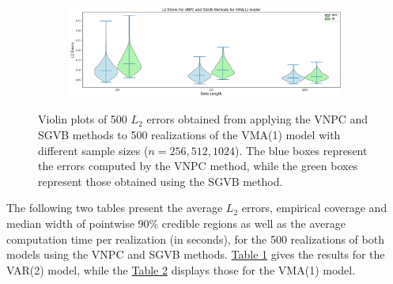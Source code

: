 \documentclass[%
 reprint,
 amsmath,amssymb,
 aps,
]{revtex4-2}
\begin{document}
\begin{figure}
\begin{subfigure}{\textwidth} %
  \centering
  \includegraphics[width=18cm]{L2 errors vma1.png}
\end{subfigure}

\caption{Violin plots of 500 $L_2$ errors obtained from applying the VNPC and SGVB methods to 500 realizations of  the VMA(1) model with different sample sizes ($n = 256, 512, 1024$). The blue boxes represent the errors computed by the VNPC method, while the green boxes represent those obtained using the  SGVB method.}
\label{l2 vma1}
\end{figure}

The following two tables present the average  $L_2$ errors, empirical coverage and median width of pointwise 90\% credible regions as well as the average computation time per realization (in seconds), for the 500 realizations of both models using the VNPC and SGVB methods. \hyperref[table l1l2 var2]{Table 1} gives the results for  the VAR(2) model, while the \hyperref[table l1l2 vma1]{Table 2} displays those for  the VMA(1) model.
\end{document}
